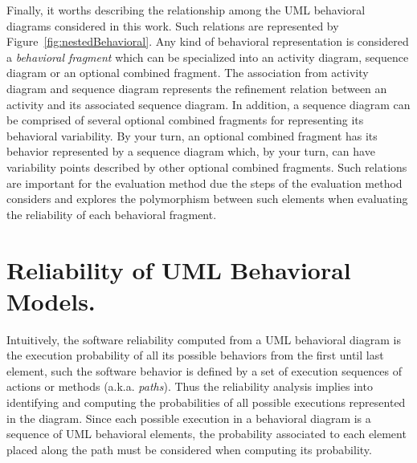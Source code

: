 Finally, it worths describing the relationship among the UML behavioral
diagrams considered in this work. Such relations are represented by
Figure~\ref{fig:nestedBehavioral}. Any kind of
behavioral representation is considered a \emph{behavioral fragment} which can be
specialized into an activity diagram, sequence diagram or an optional combined
fragment. The association from activity diagram and sequence diagram represents
the refinement relation between an activity and its associated sequence diagram.
In addition, a sequence diagram can be comprised of several optional combined fragments
for representing its behavioral variability. By your turn, an optional combined
fragment has its behavior represented by a sequence diagram which, by your turn,
can have variability points described by other optional combined fragments. Such
relations are important for the evaluation method due the steps of the
evaluation method considers and explores the polymorphism between such elements
when evaluating the reliability of each behavioral fragment. 








\section{Reliability of UML Behavioral Models.
	\label{sec:reliabilityUMLBehavioralModels}}


Intuitively, the software reliability computed from a UML behavioral diagram is
the execution probability of all its possible behaviors from the first until
last element, such the software behavior is defined by a set of execution
sequences of actions or methods (a.k.a. \emph{paths}). Thus the reliability
analysis implies into identifying and computing the probabilities of all
possible executions represented in the diagram. Since each possible execution
in a behavioral diagram is a sequence of UML behavioral elements, the
probability associated to each element placed along the path must be considered
when computing its probability. 

